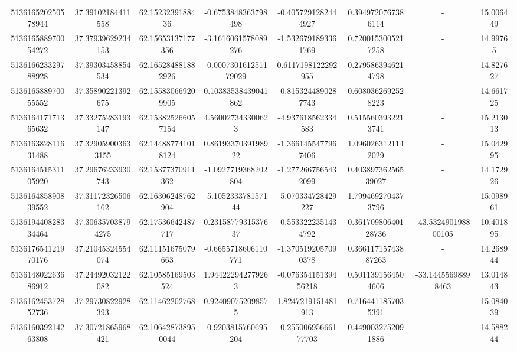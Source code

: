 \documentclass{article}
\begin{document}
\begin{landscape}
\begin{longtable}[c]{S[table-format=18.0]S[table-format=2.15]S[table-format=2.15]S[table-format=-2.17]S[table-format=-2.16]S[table-format=-2.16]S[table-format=-3.16]S[table-format=2.7]}
513616520250578944 & 37.39102184411558  & 62.1523239188436   & -0.6753848363798498   & -0.4057291282444927   & 0.3949720767386114  & {-}                  & 15.006449  \\
513616588970054272 & 37.37939629234153  & 62.15653137177356  & -3.1616061578089276   & -1.5326791893361769   & 0.7200153005217258  & {-}                  & 14.99765   \\
513616623329788928 & 37.39303458854534  & 62.165284881882926 & -0.000730161251179029 & 0.6117198122292955    & 0.2795863946214798  & {-}                  & 14.827627  \\
513616588970055552 & 37.35890221392675  & 62.155830669209905 & 0.10383538439041862   & -0.8153244890287743   & 0.6080362692528223  & {-}                  & 14.661725  \\
513616417171365632 & 37.33275283193147  & 62.153825266057154 & 4.560027343300623     & -4.937618562334583    & 0.5155603932213741  & {-}                  & 15.213013  \\
513616382811631488 & 37.329059003633155 & 62.144887741018124 & 0.8619337039198922    & -1.3661455477967406   & 1.0960263121142029  & {-}                  & 15.042995  \\
513616451531105920 & 37.29676233930743  & 62.15377370911362  & -1.0927719368202804   & -1.2772667565432099   & 0.40389736256539027 & {-}                  & 14.172926  \\
513616485890839552 & 37.31172326506162  & 62.16306248762904  & -5.105233378157144    & -5.070334728429227    & 1.7994692704373796  & {-}                  & 15.098961  \\
513619440828334464 & 37.306357038794275 & 62.17536642487717  & 0.2315877931537637    & -0.5533222351434792   & 0.36170980640128736 & -43.532490198800105 & 10.401895  \\
513617654121970176 & 37.21045324554074  & 62.11151675079663  & -0.6655718606110771   & -1.3705192057090378   & 0.36611715743887263 & {-}                  & 14.268944  \\
513614802263686912 & 37.24492032122082  & 62.10585169503524  & 1.944222942779263     & -0.07635415139456218  & 0.5011391564504606  & -33.14455698898463  & 13.014843  \\
513616245372852736 & 37.29730822928393  & 62.11462202768     & 0.924090752098575     & 1.8247219151481913    & 0.7164411857035391  & {-}                  & 15.084039  \\
513616039214263808 & 37.30721865968421  & 62.106428738950044 & -0.9203815760695204   & -0.25500695666177703  & 0.4490032752091886  & {-}                  & 14.588244  \\

\end{longtable}
\end{landscape}
\end{document}

